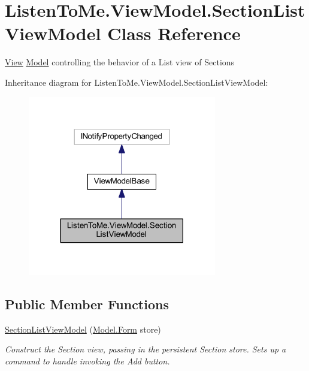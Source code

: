 \hypertarget{class_listen_to_me_1_1_view_model_1_1_section_list_view_model}{}\section{Listen\+To\+Me.\+View\+Model.\+Section\+List\+View\+Model Class Reference}
\label{class_listen_to_me_1_1_view_model_1_1_section_list_view_model}


\hyperlink{namespace_listen_to_me_1_1_view}{View} \hyperlink{namespace_listen_to_me_1_1_model}{Model} controlling the behavior of a List view of Sections  




Inheritance diagram for Listen\+To\+Me.\+View\+Model.\+Section\+List\+View\+Model\+:\nopagebreak
\begin{figure}[H]
\begin{center}
\leavevmode
\includegraphics[width=233pt]{class_listen_to_me_1_1_view_model_1_1_section_list_view_model__inherit__graph}
\end{center}
\end{figure}
\subsection*{Public Member Functions}
\begin{DoxyCompactItemize}
\item 
\hyperlink{class_listen_to_me_1_1_view_model_1_1_section_list_view_model_a483b475364b5e9af40e66451ef7cb799}{Section\+List\+View\+Model} (\hyperlink{class_listen_to_me_1_1_model_1_1_form}{Model.\+Form} store)
\begin{DoxyCompactList}\small\item\em Construct the Section view, passing in the persistent Section store. Sets up a command to handle invoking the Add button. \end{DoxyCompactList}\end{DoxyCompactItemize}
